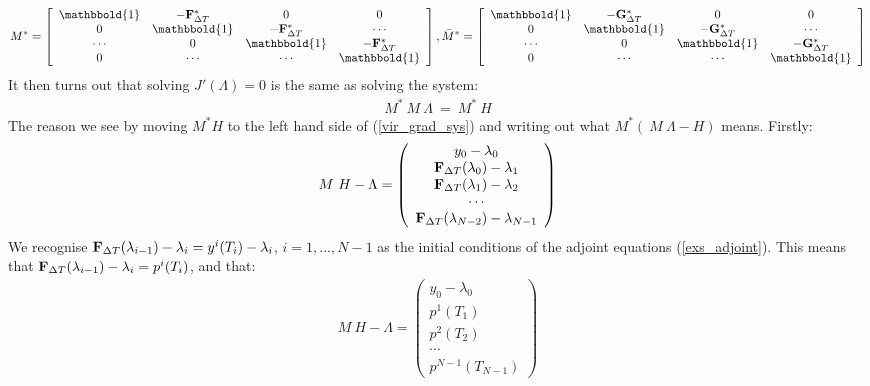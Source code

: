 \documentclass[11pt,a4paper]{article}
\begin{document}
\begin{align*}
M^*= \left[ \begin{array}{cccc}
   \mathbbold{1} & -\bold{F}_{\Delta T}^* & 0 & 0 \\  
   0 & \mathbbold{1} & -\bold{F}_{\Delta T}^* & \cdots \\ 
   \cdots &0 &  \mathbbold{1} & -\bold{F}_{\Delta T}^* \\
   0 &\cdots &\cdots &  \mathbbold{1}  \\
   \end{array}  \right],
\bar M^*= \left[ \begin{array}{cccc}
   \mathbbold{1} & -\bold{G}_{\Delta T}^* & 0 & 0 \\  
   0 & \mathbbold{1} & -\bold{G}_{\Delta T}^* & \cdots \\ 
   \cdots &0 &  \mathbbold{1} & -\bold{G}_{\Delta T}^* \\
   0 &\cdots &\cdots &  \mathbbold{1}  \\
   \end{array}  \right]
\end{align*}
It then turns out that solving $\hat{J}'(\Lambda)=0$ is the same as solving the system:
\begin{align}
M^* \ M \ \Lambda \ = \ M^* \ H \label{vir_grad_sys}
\end{align}
The reason we see by moving $M^*H$ to the left hand side of (\ref{vir_grad_sys}) and writing out what $M^*( \ M \ \Lambda-H)$ means. Firstly:
\begin{align}
M \ H-\Lambda  = \left( \begin{array}{c}
	y_0-\lambda_0  \\
	 \bold{F}_{\Delta T}(\lambda_0)-\lambda_1 \\
	 \bold{F}_{\Delta T}(\lambda_1)-\lambda_2  \\
	\cdots \\
	\bold{F}_{\Delta T}(\lambda_{N-2})-\lambda_{N-1} 
	\end{array} \right)
\end{align}
We recognise $\bold{F}_{\Delta T}(\lambda_{i-1})-\lambda_i=y^i(T_i) -\lambda_i$, $i=1,...,N-1$ as the initial conditions of the adjoint equations (\ref{exs_adjoint}). This means that $\bold{F}_{\Delta T}(\lambda_{i-1})-\lambda_i=p^i(T_i)$, and that: 
\begin{align}
M \ H-\Lambda  = \left( \begin{array}{c}
	y_0-\lambda_0  \\
	 p^1(T_1) \\
	 p^2( T_2) \\
	\cdots \\
	p^{N-1}(T_{N-1}) 
	\end{array} \right)
\end{align}
\end{document}
